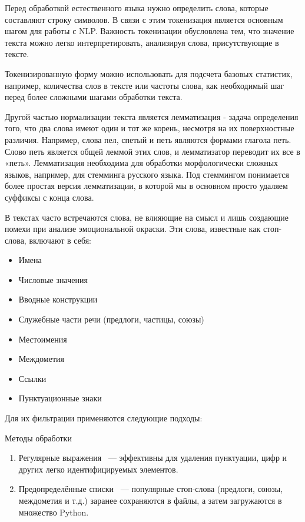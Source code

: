 \documentclass[coursework]{SCWorks}
\begin{document}
    Перед обработкой естественного языка нужно определить слова, которые составляют строку символов.
    В связи с этим токенизация является основным шагом для работы с NLP.
    Важность токенизации обусловлена тем, что значение текста можно легко интерпретировать,
    анализируя слова, присутствующие в тексте.

    Токенизированную форму можно использовать для подсчета базовых статистик, например,
    количества слов в тексте или частоты слова, как необходимый шаг перед более сложными шагами обработки текста\cite{Vashkevich}.

    Другой частью нормализации текста является лемматизация - задача определения того,
    что два слова имеют один и тот же корень, несмотря на их поверхностные различия.
    Например, слова пел, спетый и петь являются формами глагола петь.
    Слово петь является общей леммой этих слов, и лемматизатор переводит их все в «петь».
    Лемматизация необходима для обработки морфологически сложных языков, например, для стемминга русского языка.
    Под стеммингом понимается более простая версия лемматизации, в которой мы в основном просто удаляем суффиксы с конца слова.

    В текстах часто встречаются слова, не влияющие на смысл и лишь создающие помехи при анализе эмоциональной окраски.
    Эти слова, известные как стоп-слова, включают в себя:

    \begin{itemize}[label=\textbullet]
        \item Имена
        \item Числовые значения
        \item Вводные конструкции
        \item Служебные части речи (предлоги, частицы, союзы)
        \item Местоимения
        \item Междометия
        \item Ссылки
        \item Пунктуационные знаки
    \end{itemize}

    Для их фильтрации применяются следующие подходы:

    Методы обработки
    \begin{enumerate}
        \item {Регулярные выражения} ~--- эффективны для удаления пунктуации, цифр и других легко идентифицируемых элементов.
        \item {Предопределённые списки} ~--- популярные стоп-слова (предлоги, союзы, междометия и т.д.) заранее сохраняются в файлы, а затем загружаются в множество Python.
    \end{enumerate}
\end{document}

